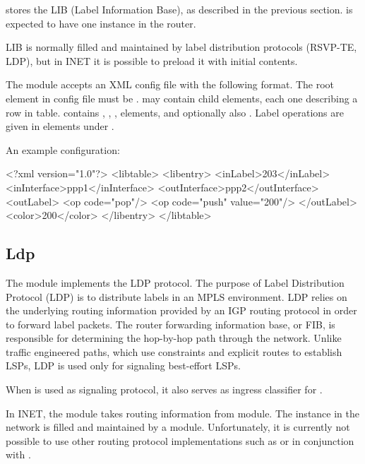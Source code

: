  stores the LIB (Label Information Base), as described
in the previous section.  is expected to have one instance
in the router. 

LIB is normally filled and maintained by label distribution protocols (RSVP-TE,
LDP), but in INET it is possible to preload it with initial contents.

The  module accepts an XML config file with the following
format. The root element in config file must be .
 may contain  child elements, each one
describing a row in table.  contains ,
, ,  elements, and
optionally also . Label operations are given in  elements
under .

An example configuration:

\begin{XML}
<?xml version="1.0"?>
<libtable>
    <libentry>
        <inLabel>203</inLabel>
        <inInterface>ppp1</inInterface>
        <outInterface>ppp2</outInterface>
        <outLabel>
            <op code="pop"/>
            <op code="push" value="200"/>
        </outLabel>
        <color>200</color>
    </libentry>
</libtable>
\end{XML}

\subsection{Ldp}

The  module implements the LDP protocol. The purpose of Label
Distribution Protocol (LDP) is to distribute labels in an MPLS environment.
LDP relies on the underlying routing information provided by an IGP routing protocol
in order to forward label packets. The router forwarding information base, or
FIB, is responsible for determining the hop-by-hop path through the network.
Unlike traffic engineered paths, which use constraints and explicit routes to
establish LSPs, LDP is used only for signaling best-effort LSPs.

When  is used as signaling protocol, it also serves as ingress
classifier for .

In INET, the  module takes routing information from 
module. The  instance in the network is filled and maintained
by a  module. Unfortunately, it is currently not
possible to use other routing protocol implementations such as  
or  in conjunction with . 

